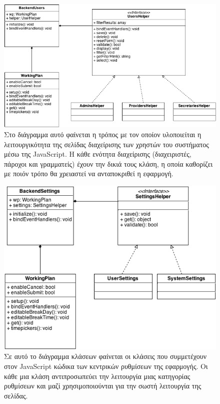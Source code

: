\begin{figure}[H]
\centering
\includegraphics[width=150mm]{images/cd-backend-users.png}
\caption{Στο διάγραμμα αυτό φαίνεται η τρόπος με τον οποίον υλοποιείται η λειτουργικότητα της σελίδας διαχείρισης των χρηστών του συστήματος μέσω της JavaScript. Η κάθε ενότητα διαχείρισης (διαχειριστές, πάροχοι και γραμματείς) έχουν την δικιά τους κλάση, η οποία καθορίζει με ποιόν τρόπο θα χρειαστεί να ανταποκριθεί η εφαρμογή.}
\label{cd-backend-users}
\end{figure}

\begin{figure}[H]
\centering
\includegraphics[width=150mm]{images/cd-backend-settings.png}
\caption{Σε αυτό το διάγραμμα κλάσεων φαίνεται οι κλάσεις που συμμετέχουν στον JavaScript κώδικα των κεντρικών ρυθμίσεων της εφαρμογής. Οι κάθε μια κλάση αντιπροσωπεύει την λειτουργία μιας κατηγορίας ρυθμίσεων και μαζί χρησιμοποιούνται για την σωστή λειτουργία της σελίδας.}
\label{cd-backend-settings}
\end{figure}

